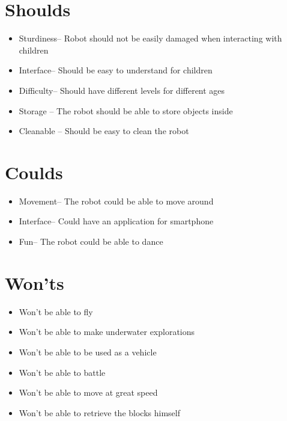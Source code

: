 \documentclass[11pt,twoside,a4paper]{report}
\begin{document}
\begin{appendices}
\section{Shoulds}
\begin{itemize}
\item Sturdiness--        Robot should not be easily damaged when interacting with children
\item Interface--         Should be easy to understand for children
\item Difficulty--         Should have different levels for different ages
\item Storage --       The robot should be able to store objects inside
\item Cleanable --       Should be easy to clean the robot
\end{itemize}
\section{Coulds}
\begin{itemize}
\item Movement--         The robot could be able to move around
\item Interface--         Could have an application for smartphone
\item Fun--             The robot could be able to dance
\end{itemize}
\section{Won\rq{}ts}
\begin{itemize}
\item Won\rq{}t be able to fly
\item Won\rq{}t be able to make underwater explorations
\item Won\rq{}t be able to be used as a vehicle     
\item Won\rq{}t be able to battle
\item Won\rq{}t be able to move at great speed     
\item Won\rq{}t be able to retrieve the blocks himself

\end{itemize}


\end{appendices}
\end{document}
